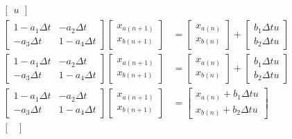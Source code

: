 \documentclass[11pt]{article}
\begin{document}
\begin{subequations}
\begin{align}
\begin{bmatrix}
      u
    \end{bmatrix} \\
    \begin{bmatrix}
      1 - a_1\Delta t & - a_2\Delta t \\
      - a_3\Delta t & 1 - a_4\Delta t
    \end{bmatrix}
    \begin{bmatrix}
      x_{a(n+1)} \\
      x_{b(n+1)}
    \end{bmatrix} &=
    \begin{bmatrix}
      x_{a(n)} \\
      x_{b(n)}
    \end{bmatrix} +
    \begin{bmatrix}
      b_1\Delta t u \\
      b_2\Delta t u
    \end{bmatrix} \\
    \begin{bmatrix}
      1 - a_1\Delta t & - a_2\Delta t \\
      - a_3\Delta t & 1 - a_4\Delta t
    \end{bmatrix}
    \begin{bmatrix}
      x_{a(n+1)} \\
      x_{b(n+1)}
    \end{bmatrix} &=
    \begin{bmatrix}
      x_{a(n)} \\
      x_{b(n)}
    \end{bmatrix} +
    \begin{bmatrix}
      b_1\Delta t u \\
      b_2\Delta t u
    \end{bmatrix} \\
    \begin{bmatrix}
      1 - a_1\Delta t & - a_2\Delta t \\
      - a_3\Delta t & 1 - a_4\Delta t
    \end{bmatrix}
    \begin{bmatrix}
      x_{a(n+1)} \\
      x_{b(n+1)}
    \end{bmatrix} &=
    \begin{bmatrix}
      x_{a(n)} + b_1\Delta t u \\
      x_{b(n)} + b_2\Delta t u
    \end{bmatrix} \\
    \begin{bmatrix}

\end{bmatrix}
\end{align}
\end{subequations}
\end{document}

